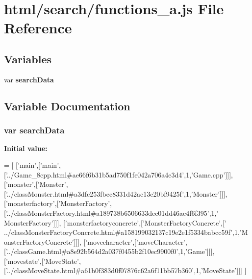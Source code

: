 \section{html/search/functions\-\_\-a.js File Reference}
\label{functions__a_8js}
\subsection*{Variables}
\begin{DoxyCompactItemize}
\item 
var {\bf search\-Data}
\end{DoxyCompactItemize}


\subsection{Variable Documentation}
\subsubsection[{search\-Data}]{\setlength{\rightskip}{0pt plus 5cm}var search\-Data}\label{functions__a_8js_ad01a7523f103d6242ef9b0451861231e}
{\bfseries Initial value\-:}
\begin{DoxyCode}
=
[
  [\textcolor{stringliteral}{'main'},[\textcolor{stringliteral}{'main'},[\textcolor{stringliteral}{'../Game\_8cpp.html#ae66f6b31b5ad750f1fe042a706a4e3d4'},1,\textcolor{stringliteral}{'Game.cpp'}]]],
  [\textcolor{stringliteral}{'monster'},[\textcolor{stringliteral}{'Monster'},[\textcolor{stringliteral}{'../classMonster.html#a3dfc253fbec8331d42ac13c20bf9425f'},1,\textcolor{stringliteral}{'Monster'}]]],
  [\textcolor{stringliteral}{'monsterfactory'},[\textcolor{stringliteral}{'MonsterFactory'},[\textcolor{stringliteral}{'../classMonsterFactory.html#a189738b6506633dec01dd46ac4f6f395'},1,\textcolor{stringliteral}{'
      MonsterFactory'}]]],
  [\textcolor{stringliteral}{'monsterfactoryconcrete'},[\textcolor{stringliteral}{'MonsterFactoryConcrete'},[\textcolor{stringliteral}{'
      ../classMonsterFactoryConcrete.html#a158199032137c19e2e1f5334babcc59f'},1,\textcolor{stringliteral}{'MonsterFactoryConcrete'}]]],
  [\textcolor{stringliteral}{'movecharacter'},[\textcolor{stringliteral}{'moveCharacter'},[\textcolor{stringliteral}{'../classGame.html#a8e92b564d2a037f0455b2f10ec9900f0'},1,\textcolor{stringliteral}{'Game'}]]],
  [\textcolor{stringliteral}{'movestate'},[\textcolor{stringliteral}{'MoveState'},[\textcolor{stringliteral}{'../classMoveState.html#a61b0f383d0f07876c62a6f11bb57b360'},1,\textcolor{stringliteral}{'MoveState'}]]]
]
\end{DoxyCode}
